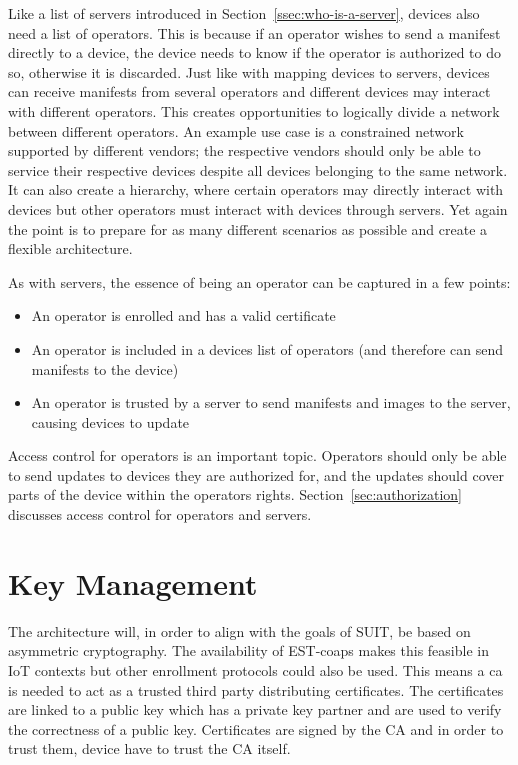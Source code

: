 \documentclass[0-thesis.tex]{subfiles}
\begin{document}
Like a list of servers introduced in Section~\ref{ssec:who-is-a-server}, devices also need
a list of operators. This is because if an operator wishes to send a manifest directly to
a device, the device needs to know if the operator is authorized to do so, otherwise it is
discarded. Just like with mapping devices to servers, devices can receive manifests from
several operators and different devices may interact with different operators. This
creates opportunities to logically divide a network between different operators. An
example use case is a constrained network supported by different vendors; the respective
vendors should only be able to service their respective devices despite all devices
belonging to the same network. It can also create a hierarchy, where certain operators may
directly interact with devices but other operators must interact with devices through
servers. Yet again the point is to prepare for as many different scenarios as possible and
create a flexible architecture.

As with servers, the essence of being an operator can be captured in a few points:

\begin{itemize}
    \item An operator is enrolled and has a valid certificate
    \item An operator is included in a devices list of operators (and therefore can send
            manifests to the device)
    \item An operator is trusted by a server to send manifests and images to the server,
            causing devices to update
\end{itemize}

Access control for operators is an important topic. Operators should only be able to send
updates to devices they are authorized for, and the updates should cover parts of the
device within the operators rights. Section~\ref{sec:authorization} discusses access
control for operators and servers.

\section{Key Management}
\label{sec:key-management}
The architecture will, in order to align with the goals of SUIT, be based on asymmetric
cryptography. The availability of EST-coaps makes this feasible in IoT contexts but other
enrollment protocols could also be used. This means a \gls{ca} is needed to act as a
trusted third party distributing certificates. The certificates are linked to a public key
which has a private key partner and are used to verify the correctness of a public key.
Certificates are signed by the CA and in order to trust them, device have to trust the CA
itself.
\end{document}

